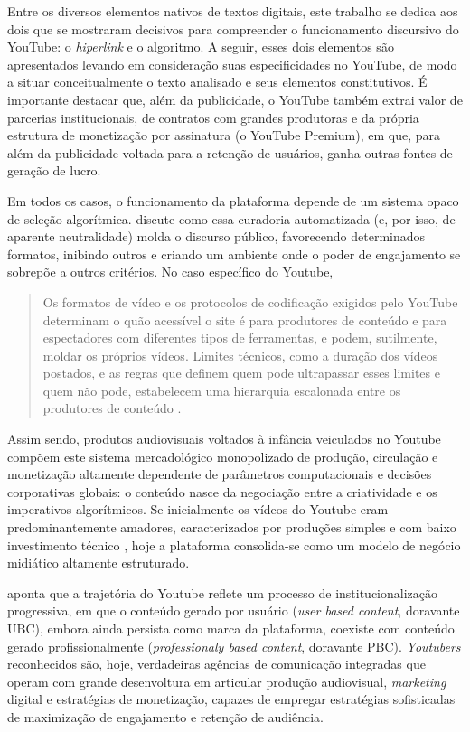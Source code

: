 \documentclass[portuguese]{textolivre}
\begin{document}
Entre os diversos elementos nativos de textos digitais, este trabalho se dedica aos dois que se mostraram decisivos para compreender o funcionamento discursivo do YouTube: o \textit{hiperlink} e o algoritmo. A seguir, esses dois elementos são apresentados levando em consideração suas especificidades no YouTube, de modo a situar conceitualmente o texto analisado e seus elementos constitutivos. É importante destacar que, além da publicidade, o YouTube também extrai valor de parcerias institucionais, de contratos com grandes produtoras e da própria estrutura de monetização por assinatura (o YouTube Premium), em que, para além da publicidade voltada para a retenção de usuários, ganha outras fontes de geração de lucro.

Em todos os casos, o funcionamento da plataforma depende de um sistema opaco de seleção algorítmica. \textcite{Gillespie2018CustodiansInternet} discute como essa curadoria automatizada (e, por isso, de aparente neutralidade) molda o discurso público, favorecendo determinados formatos, inibindo outros e criando um ambiente onde o poder de engajamento se sobrepõe a outros critérios. No caso específico do Youtube,

\begin{quote}
    Os formatos de vídeo e os protocolos de codificação exigidos pelo YouTube determinam o quão acessível o site é para produtores de conteúdo e para espectadores com diferentes tipos de ferramentas, e podem, sutilmente, moldar os próprios vídeos. Limites técnicos, como a duração dos vídeos postados, e as regras que definem quem pode ultrapassar esses limites e quem não pode, estabelecem uma hierarquia escalonada entre os produtores de conteúdo \cite[ p. 189, tradução própria]{Gillespie2018CustodiansInternet}.
\end{quote}

Assim sendo, produtos audiovisuais voltados à infância veiculados no Youtube compõem este sistema mercadológico monopolizado de produção, circulação e monetização altamente dependente de parâmetros computacionais e decisões corporativas globais: o conteúdo nasce da negociação entre a criatividade e os imperativos algorítmicos. Se inicialmente os vídeos do Youtube eram predominantemente amadores, caracterizados por produções simples e com baixo investimento técnico \cite{CunninghamCraig2019SocialMediaEntertainment}, hoje a plataforma consolida-se como um modelo de negócio midiático altamente estruturado.

\textcite{Kim2012InstitutionalizationYouTube} aponta que a trajetória do Youtube reflete um processo de institucionalização progressiva, em que o conteúdo gerado por usuário (\textit{user based content}, doravante UBC), embora ainda persista como marca da plataforma, coexiste com conteúdo gerado profissionalmente (\textit{professionaly based content}, doravante PBC). \textit{Youtubers} reconhecidos são, hoje, verdadeiras agências de comunicação integradas que operam com grande desenvoltura em articular produção audiovisual, \textit{marketing} digital e estratégias de monetização, capazes de empregar estratégias sofisticadas de maximização de engajamento e retenção de audiência.
\end{document}
